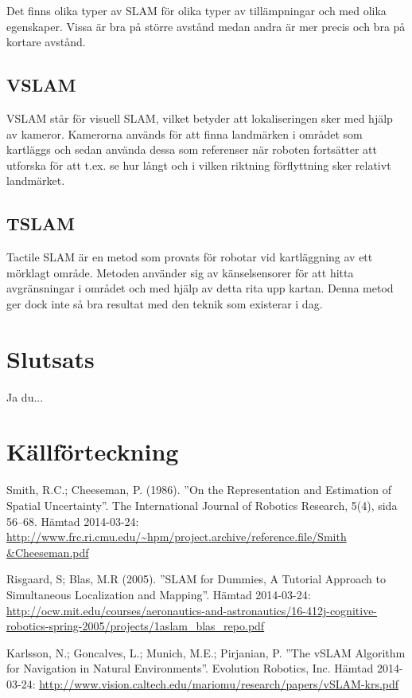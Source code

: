 \documentclass[a4paper,12pt,fleqn]{article}
\begin{document}
Det finns olika typer av SLAM för olika typer av tillämpningar och med olika egenskaper. Vissa är bra på större avstånd medan andra är mer precis och bra på kortare avstånd. 

\subsection{VSLAM}

VSLAM står för visuell SLAM, vilket betyder att lokaliseringen sker med hjälp av kameror. Kamerorna används för att finna landmärken i området som kartläggs och sedan använda dessa som referenser när roboten fortsätter att utforska för att t.ex. se hur långt och i vilken riktning förflyttning sker relativt landmärket.

\subsection{TSLAM}
Tactile SLAM är en metod som provats för robotar vid kartläggning av ett mörklagt område. Metoden använder sig av känselsensorer för att hitta avgränsningar i området och med hjälp av detta rita upp kartan. Denna metod ger dock inte så bra resultat med den teknik som existerar i dag.


\section{Slutsats}

Ja du...


\newpage \section{Källförteckning} Smith, R.C.; Cheeseman, P. (1986).
''On the Representation and Estimation of Spatial Uncertainty''. The
International Journal of Robotics Research, 5(4), sida 56–68. Hämtad
2014-03-24:
\url{http://www.frc.ri.cmu.edu/~hpm/project.archive/reference.file/Smith
&Cheeseman.pdf}

Risgaard, S; Blas, M.R (2005).
''SLAM for Dummies, A Tutorial Approach to Simultaneous Localization and Mapping''. 
Hämtad 2014-03-24:
\url{http://ocw.mit.edu/courses/aeronautics-and-astronautics/16-412j-cognitive-robotics-spring-2005/projects/1aslam_blas_repo.pdf}

Karlsson, N.; Goncalves, L.; Munich, M.E.; Pirjanian, P.
''The vSLAM Algorithm for Navigation in Natural Environments''. Evolution Robotics, Inc. Hämtad 2014-03-24:
\url{http://www.vision.caltech.edu/mariomu/research/papers/vSLAM-krs.pdf}
\end{document}
